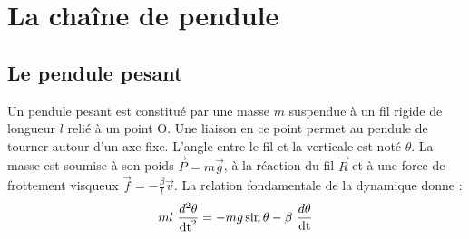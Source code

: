 \section{La chaîne de pendule}

\subsection{Le pendule pesant}
\begin{multicols}{2}%

\columnbreak
Un pendule pesant est constitué par une masse $m$ suspendue à un fil rigide de longueur $l$ relié à un point O. Une liaison en ce point permet au pendule de tourner autour d'un axe fixe. L'angle entre le fil et la verticale est noté $\theta$. La masse est soumise à son poids $\overrightarrow{P}=m\overrightarrow{g}$, à la réaction du fil $\overrightarrow{R}$ et à une force de frottement visqueux $\overrightarrow{f}= - \frac{\beta}{l} \overrightarrow{v}$. La relation fondamentale de la dynamique donne :
\[
m l\ \frac{d^2 \theta}{\operatorname{dt}^2} =  - m g \sin{\theta}  -  \beta\ \frac{d \theta}{\operatorname{dt}}
\]
\end{multicols}
%
